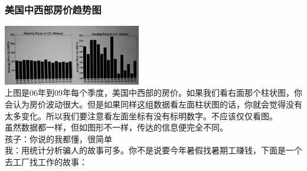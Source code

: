 \hypertarget{ux7f8eux56fdux4e2dux897fux90e8ux623fux4ef7ux8d8bux52bfux56fe}{%
\subsubsection{美国中西部房价趋势图}\label{ux7f8eux56fdux4e2dux897fux90e8ux623fux4ef7ux8d8bux52bfux56fe}}


\includegraphics[width=6cm]{Stat_f22-1_11.png}\\



上图是06年到09年每个季度，美国中西部的房价。如果我们看右面那个柱状图，你会认为房价波动很大。但是如果同样这组数据看左面柱状图的话，你就会觉得没有太多变化。所以我们要注意看左面坐标有没有标明数字。不应该仅仅看图。\\
虽然数据都一样，但如图形不一样，传达的信息便完全不同。\\
孩子：你说的我都懂，很简单\\
我：用统计分析骗人的故事可多。你不是说要今年暑假找暑期工赚钱，下面是一个去工厂找工作的故事：\\

